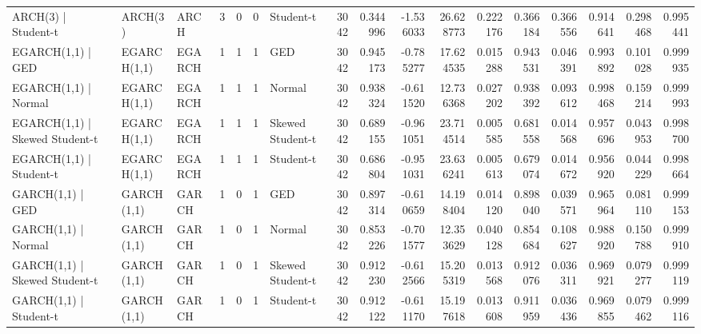\begin{tabular}{lllrrrlrrrrrrrrrr}
ARCH(3) | Student-t & ARCH(3) & ARCH & 3 & 0 & 0 & Student-t & 3042 & 0.344996 & -1.536033 & 26.628773 & 0.222176 & 0.366184 & 0.366556 & 0.914641 & 0.298468 & 0.995441 \\
EGARCH(1,1) | GED & EGARCH(1,1) & EGARCH & 1 & 1 & 1 & GED & 3042 & 0.945173 & -0.785277 & 17.624535 & 0.015288 & 0.943531 & 0.046391 & 0.993892 & 0.101028 & 0.999935 \\
EGARCH(1,1) | Normal & EGARCH(1,1) & EGARCH & 1 & 1 & 1 & Normal & 3042 & 0.938324 & -0.611520 & 12.736368 & 0.027202 & 0.938392 & 0.093612 & 0.998468 & 0.159214 & 0.999993 \\
EGARCH(1,1) | Skewed Student-t & EGARCH(1,1) & EGARCH & 1 & 1 & 1 & Skewed Student-t & 3042 & 0.689155 & -0.961051 & 23.714514 & 0.005585 & 0.681558 & 0.014568 & 0.957696 & 0.043953 & 0.998700 \\
EGARCH(1,1) | Student-t & EGARCH(1,1) & EGARCH & 1 & 1 & 1 & Student-t & 3042 & 0.686804 & -0.951031 & 23.636241 & 0.005613 & 0.679074 & 0.014672 & 0.956920 & 0.044229 & 0.998664 \\
GARCH(1,1) | GED & GARCH(1,1) & GARCH & 1 & 0 & 1 & GED & 3042 & 0.897314 & -0.610659 & 14.198404 & 0.014120 & 0.898040 & 0.039571 & 0.965964 & 0.081110 & 0.999153 \\
GARCH(1,1) | Normal & GARCH(1,1) & GARCH & 1 & 0 & 1 & Normal & 3042 & 0.853226 & -0.701577 & 12.353629 & 0.040128 & 0.854684 & 0.108627 & 0.988920 & 0.150788 & 0.999910 \\
GARCH(1,1) | Skewed Student-t & GARCH(1,1) & GARCH & 1 & 0 & 1 & Skewed Student-t & 3042 & 0.912230 & -0.612566 & 15.205319 & 0.013568 & 0.912076 & 0.036311 & 0.969921 & 0.079277 & 0.999119 \\
GARCH(1,1) | Student-t & GARCH(1,1) & GARCH & 1 & 0 & 1 & Student-t & 3042 & 0.912122 & -0.611170 & 15.197618 & 0.013608 & 0.911959 & 0.036436 & 0.969855 & 0.079462 & 0.999116 \\
\bottomrule
\end{tabular}
